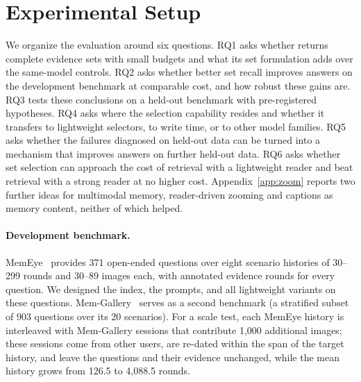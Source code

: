 \section{Experimental Setup}
\label{sec:setup}

We organize the evaluation around six questions. RQ1 asks whether \qss{} returns complete evidence sets with small budgets and what its set formulation adds over the same-model controls. RQ2 asks whether better set recall improves answers on the development benchmark at comparable cost, and how robust these gains are. RQ3 tests these conclusions on a held-out benchmark with pre-registered hypotheses. RQ4 asks where the selection capability resides and whether it transfers to lightweight selectors, to write time, or to other model families. RQ5 asks whether the failures diagnosed on held-out data can be turned into a mechanism that improves answers on further held-out data. RQ6 asks whether set selection can approach the cost of retrieval with a lightweight reader and beat retrieval with a strong reader at no higher cost. Appendix~\ref{app:zoom} reports two further ideas for multimodal memory, reader-driven zooming and captions as memory content, neither of which helped.

\paragraph{Development benchmark.} MemEye~\citep{guo2026memeye} provides 371 open-ended questions over eight scenario histories of 30--299 rounds and 30--89 images each, with annotated evidence rounds for every question. We designed the index, the prompts, and all lightweight variants on these questions. Mem-Gallery~\citep{bei2026memgallery} serves as a second benchmark (a stratified subset of 903 questions over its 20 scenarios). For a scale test, each MemEye history is interleaved with Mem-Gallery sessions that contribute 1,000 additional images; these sessions come from other users, are re-dated within the span of the target history, and leave the questions and their evidence unchanged, while the mean history grows from 126.5 to 4,088.5 rounds.

